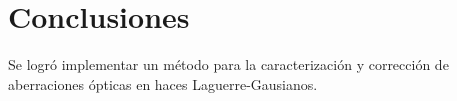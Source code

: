 


\chapter{Conclusiones}
\label{cha:Conclusiones}



Se logró implementar un método para la caracterización y corrección de
aberraciones ópticas en haces Laguerre-Gausianos. 






